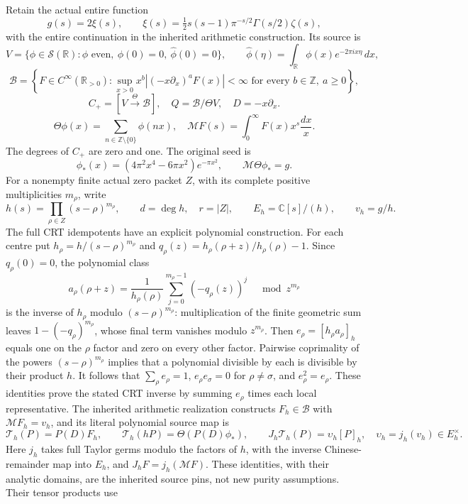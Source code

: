 Retain the actual entire function
\[
g(s)=2\xi(s),\qquad
\xi(s)=\tfrac12s(s-1)\pi^{-s/2}\Gamma(s/2)\zeta(s),
\]
with the entire continuation in the inherited arithmetic construction.
Its source is
\[
V=\{\phi\in\mathcal S(\mathbb R):\phi\text{ even},\
\phi(0)=0,\ \widehat\phi(0)=0\},\qquad
\widehat\phi(\eta)=\int_{\mathbb R}\phi(x)e^{-2\pi ix\eta}\,dx,
\]
\[
\mathscr B=\left\{F\in C^\infty(\mathbb R_{>0}):
\sup_{x>0}x^b|(-x\partial_x)^aF(x)|<\infty
\text{ for every }b\in\mathbb Z,\ a\ge0\right\},
\]
\[
C_+=[V\xrightarrow{\Theta}\mathscr B],\quad
Q=\mathscr B/\Theta V,\quad
D=-x\partial_x.
\]
\[
\Theta\phi(x)=\sum_{n\in\mathbb Z\setminus\{0\}}\phi(nx),\quad
\mathcal MF(s)=\int_0^\infty F(x)x^s\frac{dx}{x}.
\]
The degrees of \(C_+\) are zero and one. The original seed is
\[
\phi_*(x)=(4\pi^2x^4-6\pi x^2)e^{-\pi x^2},\qquad
\mathcal M\Theta\phi_*=g.
\]
For a nonempty finite actual zero packet \(Z\), with its complete positive
multiplicities \(m_\rho\), write
\[
h(s)=\prod_{\rho\in Z}(s-\rho)^{m_\rho},\qquad
d=\deg h,\quad r=|Z|,\qquad E_h=\mathbb C[s]/(h),\qquad
v_h=g/h.
\]
The full CRT idempotents have an explicit polynomial construction.
For each centre put \(h_\rho=h/(s-\rho)^{m_\rho}\) and
\(q_\rho(z)=h_\rho(\rho+z)/h_\rho(\rho)-1\).
Since \(q_\rho(0)=0\), the polynomial class
\[
a_\rho(\rho+z)=\frac1{h_\rho(\rho)}
\sum_{j=0}^{m_\rho-1}(-q_\rho(z))^j
\quad\bmod z^{m_\rho}
\]
is the inverse of \(h_\rho\) modulo \((s-\rho)^{m_\rho}\):
multiplication of the finite geometric sum leaves
\(1-(-q_\rho)^{m_\rho}\), whose final term vanishes modulo
\(z^{m_\rho}\).
Then \(e_\rho=[h_\rho a_\rho]_h\) equals one on the \(\rho\)
factor and zero on every other factor. Pairwise coprimality of
the powers \((s-\rho)^{m_\rho}\) implies that a polynomial
divisible by each is divisible by their product \(h\).
It follows that \(\sum_\rho e_\rho=1\),
\(e_\rho e_\sigma=0\) for \(\rho\ne\sigma\), and
\(e_\rho^2=e_\rho\). These identities prove the stated CRT
inverse by summing \(e_\rho\) times each local representative.
The inherited arithmetic realization constructs \(F_h\in\mathscr B\)
with \(\mathcal MF_h=v_h\), and its literal polynomial source map is
\[
\mathcal T_h(P)=P(D)F_h,\qquad
\mathcal T_h(hP)=\Theta(P(D)\phi_*),\qquad
J_h\mathcal T_h(P)=\upsilon_h[P]_h,\quad
\upsilon_h=j_h(v_h)\in E_h^\times.
\]
Here \(j_h\) takes full Taylor germs modulo the factors of \(h\), with
the inverse Chinese-remainder map into \(E_h\), and
\(J_hF=j_h(\mathcal MF)\).
These identities, with their analytic domains, are the inherited
source pins, not new purity assumptions. Their tensor products use
